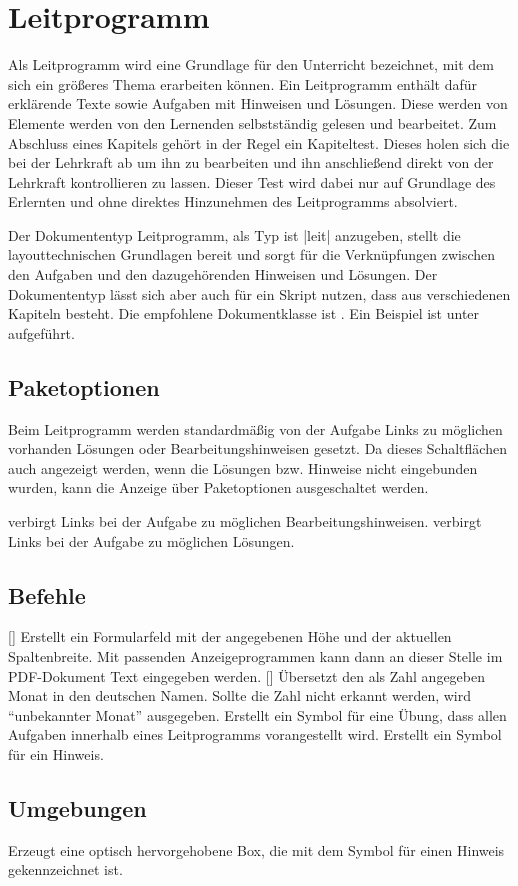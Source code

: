 \section{Leitprogramm}
\label{typ:Leitprogramm}
Als Leitprogramm wird eine Grundlage für den Unterricht bezeichnet, mit dem \SuS sich ein größeres Thema erarbeiten können. Ein Leitprogramm enthält dafür erklärende Texte sowie Aufgaben mit Hinweisen und Lösungen. Diese werden von Elemente werden von den Lernenden selbstständig gelesen und bearbeitet. Zum Abschluss eines Kapitels gehört in der Regel ein Kapiteltest. Dieses holen sich die \SuS bei der Lehrkraft ab um ihn zu bearbeiten und ihn anschließend direkt von der Lehrkraft kontrollieren zu lassen. Dieser Test wird dabei nur auf Grundlage des Erlernten und ohne direktes Hinzunehmen des Leitprogramms absolviert.

Der Dokumententyp Leitprogramm, als Typ ist \verbcode|leit| anzugeben, stellt die layouttechnischen Grundlagen bereit und sorgt für die Verknüpfungen zwischen den Aufgaben und den dazugehörenden Hinweisen und Lösungen. Der Dokumententyp lässt sich aber auch für ein Skript nutzen, dass aus verschiedenen Kapiteln besteht. Die empfohlene Dokumentklasse ist . Ein Beispiel ist unter  aufgeführt.

\subsection{Paketoptionen}
Beim Leitprogramm werden standardmäßig von der Aufgabe Links zu möglichen vorhanden Lösungen oder Bearbeitungshinweisen gesetzt. Da dieses Schaltflächen auch angezeigt werden, wenn die Lösungen bzw. Hinweise nicht eingebunden wurden, kann die Anzeige über Paketoptionen ausgeschaltet werden.
\begin{options}
     verbirgt Links bei der Aufgabe zu möglichen Bearbeitungshinweisen.
     verbirgt Links bei der Aufgabe zu möglichen Lösungen.
\end{options}

\subsection{Befehle}
\begin{commands}
    [] Erstellt ein Formularfeld mit der angegebenen Höhe und der aktuellen Spaltenbreite. Mit passenden Anzeigeprogrammen kann dann an dieser Stelle im PDF-Dokument Text eingegeben werden.
    [] Übersetzt den als Zahl angegeben Monat in den deutschen Namen. Sollte die Zahl nicht erkannt werden, wird \enquote{unbekannter Monat} ausgegeben.
     Erstellt ein Symbol für eine Übung, dass allen Aufgaben innerhalb eines Leitprogramms vorangestellt wird.
     Erstellt ein Symbol für ein Hinweis.
\end{commands}

\subsection{Umgebungen}
\begin{environments}
     Erzeugt eine optisch hervorgehobene Box, die mit dem Symbol für einen Hinweis gekennzeichnet ist.
\end{environments}